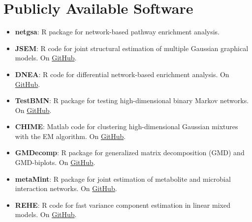 \documentclass[10pt]{article}
\begin{document}
\section*{Publicly Available Software}
\begin{itemize}
\item {\bf netgsa}: R package for network-based pathway enrichment analysis. 
\item {\bf JSEM}: R code for joint structural estimation of multiple Gaussian graphical models. On \href{https://github.com/drjingma/JSEM}{GitHub}.
\item {\bf DNEA}: R code for differential network-based enrichment analysis. On \href{https://github.com/wiggie/DNEA}{GitHub}.
\item {\bf TestBMN}: R package for testing high-dimensional binary Markov networks. On \href{https://github.com/drjingma/TestBMN}{GitHub}.
\item {\bf CHIME}: Matlab code for clustering high-dimensional Gaussian mixtures with the EM algorithm. On \href{https://github.com/drjingma/gmm}{GitHub}.
\item {\bf GMDecomp}: R package for generalized matrix decomposition (GMD) and GMD-biplots. On \href{https://github.com/taryue/GMDecomp}{GitHub}.
\item \textbf{metaMint}: R package for joint estimation of metabolite and microbial interaction networks. On \href{https://github.com/drjingma/metaMint}{GitHub}.
\item \textbf{REHE}: R code for fast variance component estimation in linear mixed models. On \href{https://github.com/yuek9/REHE}{GitHub}.
\end{itemize}



\end{document}
